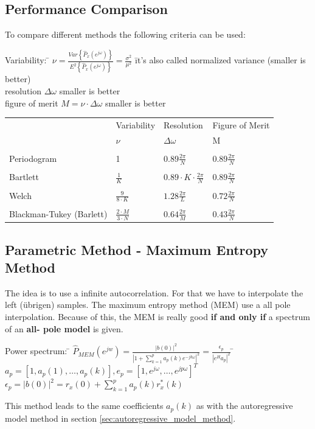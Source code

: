 \subsection{Performance Comparison }
To compare different methods the following criteria can be used:\\
\begin{tabbing}
Variability:   \hspace{1cm}  	\= 
  $\nu=\frac{Var\left\lbrace\hat{P}_{x}(e^{j\omega})\right\rbrace}{E^2\left\lbrace\hat{P}_{x}(e^{j\omega})\right\rbrace}=\frac{\sigma^2}{\mu^2}$ 
  \hspace{1cm} \= it's also called normalized variance (smaller is better)\\
  resolution \> $\Delta \omega$ \> smaller is better\\
  figure of merit					\> $M=\nu\cdot \Delta\omega$ \> smaller is better\\
\end{tabbing}
\begin{tabular}{p{3cm} | p{2cm} p{2.5cm} p{3cm}}
& Variability & Resolution & Figure of Merit\\
& $\nu$	&	$\Delta\omega$	& M \\
\hline\\
Periodogram & 1 & $0.89 \frac{2\pi}{N}$ & $0.89 \frac{2\pi}{N}$\\\\
Bartlett & $\frac{1}{K}$ & $0.89\cdot K \cdot  \frac{2\pi}{N}$ & $0.89 \frac{2\pi}{N}$\\\\
Welch & $\frac{9}{8\cdot K}$ & $1.28 \frac{2\pi}{L}$ & $0.72 \frac{2\pi}{N}$\\\\
Blackman-Tukey (Barlett)& $\frac{2\cdot M}{3\cdot N}$  & $0.64 \frac{2\pi}{M}$ & $0.43 \frac{2\pi}{N}$
\end{tabular}

\subsection{Parametric Method - Maximum Entropy Method }
The idea is to use a infinite autocorrelation. For that we have to interpolate the left (übrigen) samples. 
The maximum entropy method (MEM) use a all pole interpolation.
Because of this, the MEM is really good \textbf{if and only if} a spectrum of an \textbf{all- pole model} is given.

\begin{tabbing}
Power spectrum:  	\=  $\hat{P}_{MEM}(e^{jw}) =  \frac{|b(0)|^2}{\left| 1 + \sum\limits_{k=1}^{p} a_p(k)e^{-jk\omega}\right|^2} = \frac{\epsilon_p}{\left|e^H a_p\right|^2}$ \hspace{1cm} \= $a_p=[1,a_p(1),\ldots, a_p(k)],e_p=[1,e^{j\omega},\ldots, e^{jp\omega}]^T $ \\
\>						$\epsilon_p = |b(0)|^2 = r_x(0) + \sum\limits_{k=1}^p a_p(k) r_x^*(k)$ \\
\end{tabbing}
This method leads to the same coefficients $a_p(k)$ as with the autoregressive model method in section \ref{sec:autoregressive_model_method}.

